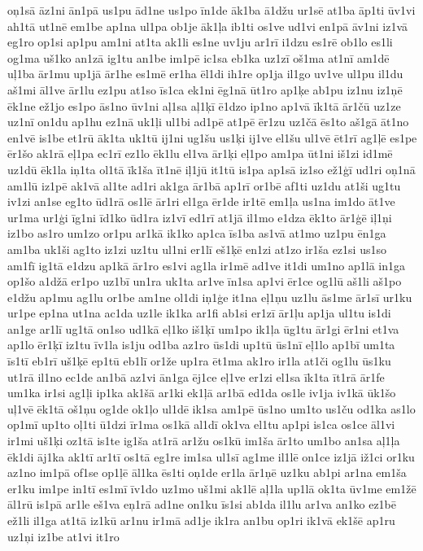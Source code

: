 {oņ1sā
āz1ni
ān1pā
us1pu
ād1ne
us1po
īn1de
āk1ba
ā1džu
ur1sē
at1ba
āp1ti
ūv1vi
ah1tā
ut1nē
em1be
ap1na
ul1pa
ob1je
āk1ļa
ib1ti
os1ve
ud1vi
en1pā
āv1ni
iz1vā
eg1ro
op1si
ap1pu
am1ni
at1ta
ak1li
es1ne
uv1ju
ar1rī
i1dzu
es1rē
ob1lo
es1li
og1ma
uš1ko
an1zā
ig1tu
an1be
im1pē
ic1sa
eb1ka
uz1zī
oš1ma
at1nī
am1dē
uļ1ba
ār1mu
up1jā
ār1he
es1mē
er1ha
ēl1di
ih1re
op1ja
il1go
uv1ve
ul1pu
il1du
aš1mi
āl1ve
ār1lu
ez1pu
at1so
īs1ca
ek1ni
ēg1nā
ūt1ro
ap1ķe
ab1pu
iz1nu
iz1ņē
ēk1ne
ež1jo
es1po
ās1no
ūv1ni
aļ1sa
aļ1ķī
ē1dzo
ip1no
ap1vā
īk1tā
ār1čū
uz1ze
uz1nī
on1du
ap1hu
ez1nā
uk1ļi
ul1bi
ad1pē
at1pē
ēr1zu
uz1čā
ēs1to
aš1gā
āt1no
en1vē
is1be
et1rū
āk1ta
uk1tū
ij1ni
ug1šu
us1ķi
ij1ve
el1šu
ul1vē
ēt1rī
ag1ļē
es1pe
ēr1šo
ak1rā
eļ1pa
ec1rī
ez1lo
ēk1lu
el1va
ār1ķi
eļ1po
am1pa
ūt1ni
iš1zi
id1mē
uz1dū
ēk1la
iņ1ta
ol1tā
īk1ša
īt1nē
iļ1jū
it1tū
is1pa
ap1sā
iz1so
ež1ģī
ud1ri
oņ1nā
am1lū
iz1pē
ak1vā
al1te
ad1ri
ak1ga
ār1bā
ap1rī
or1bē
af1ti
uz1du
at1ši
ug1tu
iv1zi
an1se
eg1to
ūd1rā
os1lē
ār1ri
el1ga
ēr1de
ir1tē
em1ļa
us1na
im1do
āt1ve
ur1ma
ur1ģi
īg1ni
īd1ko
ūd1ra
iz1vī
ed1rī
at1jā
il1mo
e1dza
ēk1to
ār1ģē
iļ1ņi
iz1bo
as1ro
um1zo
or1pu
ar1kā
ik1ko
ap1ca
īs1ba
as1vā
at1mo
uz1pu
ēn1ga
am1ba
uk1ši
ag1to
iz1zi
uz1tu
ul1ni
er1lī
eš1ķē
en1zi
at1zo
ir1ša
ez1si
us1so
am1fī
ig1tā
e1dzu
ap1kā
ār1ro
es1vi
ag1la
ir1mē
ad1ve
it1di
um1no
ap1lā
in1ga
op1šo
a1džā
er1po
uz1bī
un1ra
uk1ta
ar1ve
īn1sa
ap1vi
ēr1ce
og1lū
aš1li
aš1po
e1džu
ap1mu
ag1lu
or1be
am1ne
ol1di
iņ1ģe
it1na
eļ1ņu
uz1lu
ās1me
ār1sī
ur1ku
ur1pe
ep1na
ut1na
ac1da
uz1le
ik1ka
ar1fi
ab1si
er1zī
ār1ļu
ap1ja
ul1tu
is1di
an1ge
ar1lī
ug1tā
on1so
ud1kā
eļ1ko
iš1ķī
um1po
ik1ļa
ūg1tu
ār1gi
ēr1ni
et1va
ap1lo
ēr1ķī
iz1tu
īv1la
is1ju
od1ba
az1ro
ūs1di
up1tū
ūs1nī
eļ1lo
ap1bī
um1ta
īs1tī
eb1rī
uš1ķē
ep1tū
eb1lī
or1že
up1ra
ēt1ma
ak1ro
ir1la
at1či
og1lu
ūs1ku
ut1rā
il1no
ec1de
an1bā
az1vi
ān1ga
ēj1ce
eļ1ve
er1zi
el1sa
īk1ta
īt1rā
ār1fe
um1ka
ir1si
ag1ļi
ip1ka
ak1šā
ar1ki
ek1ļā
ar1bā
ed1da
os1le
iv1ja
iv1kā
ūk1šo
uļ1vē
ēk1tā
oš1ņu
og1de
ok1ļo
ul1dē
ik1sa
am1pē
ūs1no
um1to
us1ču
od1ka
as1lo
op1mī
up1to
oļ1ti
ū1dzi
īr1ma
os1kā
al1dī
ok1va
el1tu
ap1pi
is1ca
os1ce
āl1vi
ir1mi
uš1ķi
oz1tā
is1te
ig1ša
at1rā
ar1žu
os1kū
im1ša
ār1to
um1bo
an1sa
aļ1ļa
ēk1di
āj1ka
ak1tī
ar1tī
os1tā
eg1re
im1sa
ul1sī
ag1me
il1lē
on1ce
iz1jā
iž1ci
or1ku
az1no
im1pā
of1se
op1ļē
āl1ka
ēs1ti
oņ1de
er1la
ār1ņē
uz1ku
ab1pi
ar1na
em1ša
er1ku
im1pe
in1tī
es1mī
īv1do
uz1mo
uš1mi
ak1lē
aļ1la
up1lā
ok1ta
ūv1me
em1žē
āl1rū
is1pā
ar1le
eš1va
eņ1rā
ad1ne
on1ku
īs1si
ab1da
il1lu
ar1va
an1ko
ez1bē
ež1li
il1ga
at1tā
iz1kū
ar1nu
ir1mā
ad1je
ik1ra
an1bu
op1ri
ik1vā
ek1šē
ap1ru
uz1ņi
iz1be
at1vi
it1ro
}
